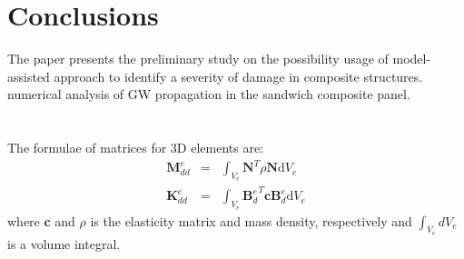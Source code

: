 \documentclass[a4paper,12pt]{article}
\newcommand{\rmd}{\mathrm{d}}
\begin{document}
{\section{Conclusions}
\label{sec:conc}
The paper presents the preliminary study on the possibility usage of model-assisted approach to identify a severity of damage in composite structures. 
numerical analysis of GW propagation in the sandwich composite panel.  
\appendix
\section{}
\label{app:matrices}
The formulae of matrices for 3D elements are:
\begin{eqnarray}
\textbf{M}_{dd}^e & = & \int_{V_e}\textbf{N}^T\rho \textbf{N}\rmd V_e\\
\textbf{K}_{dd}^e & = & \int_{V_e}{\textbf{B}_d^e}^T\textbf{c}\textbf{B}_d^e\rmd V_e
\end{eqnarray}
where \textbf{c} and \(\rho\) is the elasticity matrix and mass density, 
respectively and \(\int_{V_e}dV_e\) is a volume integral.

}
\end{document}
